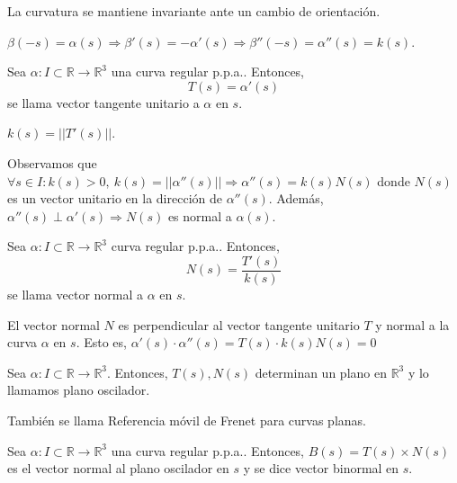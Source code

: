 \begin{prop}
  La curvatura se mantiene invariante ante un cambio de orientación. 
\end{prop}

\begin{dem}
  $\beta(-s) = \alpha(s) \Rightarrow \beta'(s) = -\alpha'(s) \Rightarrow \beta''(-s) = \alpha''(s) = k(s)$. 
\end{dem}

\begin{defn}
  Sea $\alpha  : I \subset \mathbb{R} \to \mathbb{R}^{3}$ una curva regular p.p.a.. Entonces,
  \[
    T(s) = \alpha'(s) \]
  se llama vector tangente unitario a $\alpha$ en $s$.
\end{defn}

\begin{obs}
  $k(s) = ||T'(s)||$.
\end{obs}

\begin{note}
  Observamos que $\forall s \in I: k(s) > 0, \ k(s) = ||\alpha''(s)|| \Rightarrow \alpha''(s) = k(s) N(s)$ donde $N(s)$ es un vector unitario en la dirección de $\alpha''(s)$. Además, $\alpha''(s) \perp \alpha'(s) \Rightarrow N(s)$ es normal a $\alpha(s)$.
\end{note}

\begin{defn}
  Sea $\alpha  : I \subset \mathbb{R} \to \mathbb{R}^{3}$ curva regular p.p.a.. Entonces, 
  \[ 
    N(s) = \frac{T'(s)}{k(s)} 
  \] 
  se llama vector normal a $\alpha$ en $s$.
\end{defn}

\begin{obs}
  El vector normal $N$ es perpendicular al vector tangente unitario $T$ y normal a la curva $\alpha$ en $s$. Esto es, $\alpha'(s) \cdot \alpha''(s) = T(s) \cdot k(s)N(s) = 0$
\end{obs}

\begin{defn}
  Sea $\alpha  : I \subset \mathbb{R} \to \mathbb{R}^{3}$. Entonces, $T(s),N(s)$ determinan un plano en $\mathbb{R}^{3}$ y lo llamamos plano oscilador.
\end{defn}

\begin{obs}
  También se llama Referencia móvil de Frenet para curvas planas.
\end{obs}

\begin{defn}
  Sea $\alpha  : I \subset \mathbb{R} \to \mathbb{R}^{3}$ una curva regular p.p.a.. Entonces, $B(s) = T(s) \times N(s)$ es el vector normal al plano oscilador en $s$ y se dice vector binormal en $s$.
\end{defn}

